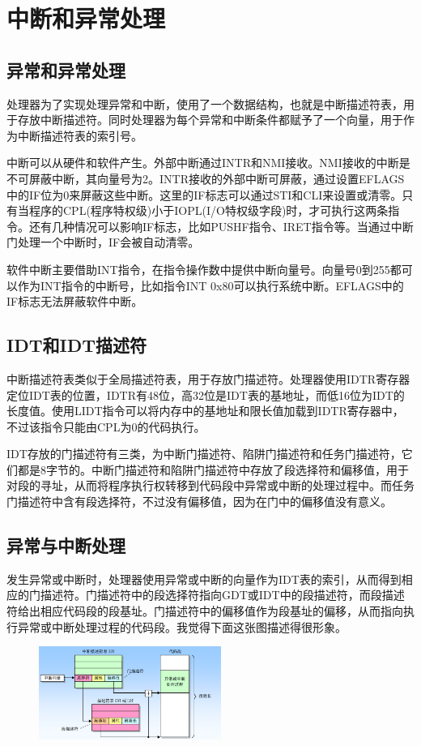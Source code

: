 \documentclass[a4paper,left=2.5cm,right=2.5cm,11pt]{article}
\begin{document}
\section{中断和异常处理}
\subsection{异常和异常处理}
处理器为了实现处理异常和中断，使用了一个数据结构，也就是中断描述符表，用于存放中断描述符。同时处理器为每个异常和中断条件都赋予了一个向量，用于作为中断描述符表的索引号。\par
	中断可以从硬件和软件产生。外部中断通过INTR和NMI接收。NMI接收的中断是不可屏蔽中断，其向量号为2。INTR接收的外部中断可屏蔽，通过设置EFLAGS中的IF位为0来屏蔽这些中断。这里的IF标志可以通过STI和CLI来设置或清零。只有当程序的CPL(程序特权级)小于IOPL(I/O特权级字段)时，才可执行这两条指令。还有几种情况可以影响IF标志，比如PUSHF指令、IRET指令等。当通过中断门处理一个中断时，IF会被自动清零。\par
	软件中断主要借助INT指令，在指令操作数中提供中断向量号。向量号0到255都可以作为INT指令的中断号，比如指令INT 0x80可以执行系统中断。EFLAGS中的IF标志无法屏蔽软件中断。\par

\subsection{IDT和IDT描述符}
中断描述符表类似于全局描述符表，用于存放门描述符。处理器使用IDTR寄存器定位IDT表的位置，IDTR有48位，高32位是IDT表的基地址，而低16位为IDT的长度值。使用LIDT指令可以将内存中的基地址和限长值加载到IDTR寄存器中，不过该指令只能由CPL为0的代码执行。\par
	IDT存放的门描述符有三类，为中断门描述符、陷阱门描述符和任务门描述符，它们都是8字节的。中断门描述符和陷阱门描述符中存放了段选择符和偏移值，用于对段的寻址，从而将程序执行权转移到代码段中异常或中断的处理过程中。而任务门描述符中含有段选择符，不过没有偏移值，因为在门中的偏移值没有意义。\par

\subsection{异常与中断处理}
	发生异常或中断时，处理器使用异常或中断的向量作为IDT表的索引，从而得到相应的门描述符。门描述符中的段选择符指向GDT或IDT中的段描述符，而段描述符给出相应代码段的段基址。门描述符中的偏移值作为段基址的偏移，从而指向执行异常或中断处理过程的代码段。我觉得下面这张图描述得很形象。\par
	\begin{figure}[H]
		\center
		\includegraphics[width=0.53\textwidth]{1.png}
	\end{figure}
	
\end{document}
